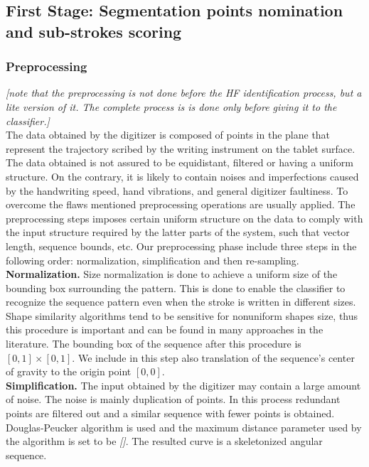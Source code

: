 \documentclass[journal,compsoc]{IEEEtran}
\begin{document}
\subsection{First Stage: Segmentation points nomination and sub-strokes scoring}
\subsubsection{Preprocessing}
\label{preprocessing}

\emph{[note that the preprocessing is not done before the HF identification process, but a lite version of it. The complete process is is done only before giving it to the classifier.]}\\

The data obtained by the digitizer is composed of points in the plane that represent the trajectory scribed by the writing instrument on the tablet surface. The data obtained is not assured to be equidistant, filtered or having a uniform structure. On the contrary, it is likely to contain noises and imperfections caused by the handwriting speed, hand vibrations, and general digitizer faultiness.   
To overcome the flaws mentioned preprocessing operations are usually applied. The preprocessing steps imposes certain uniform structure on the data to comply with the input structure required by the latter parts of the system, such that vector length, sequence bounds, etc.
Our preprocessing phase include three steps in the following order: normalization, simplification and then re-sampling.\\

\textbf{Normalization.} Size normalization is done to achieve a uniform size of the bounding box surrounding the pattern. This is done to enable the classifier to recognize the sequence pattern even when the stroke is written in different sizes. Shape similarity algorithms tend to be sensitive for nonuniform shapes size, thus this procedure is important and can be found in many approaches in the literature. The bounding box of the sequence after this procedure is $[0,1]\times[0,1]$. We include in this step also translation of the sequence's center of gravity to the origin point $[0,0]$.\\

\textbf{Simplification.} The input obtained by the digitizer may contain a large amount of noise. The noise is mainly duplication of points. In this process redundant points are filtered out and a similar sequence with fewer points is obtained. Douglas-Peucker algorithm is used and the maximum distance parameter used by the algorithm is set to be \emph{[]}. The resulted curve is a skeletonized angular sequence. \\
\end{document}
